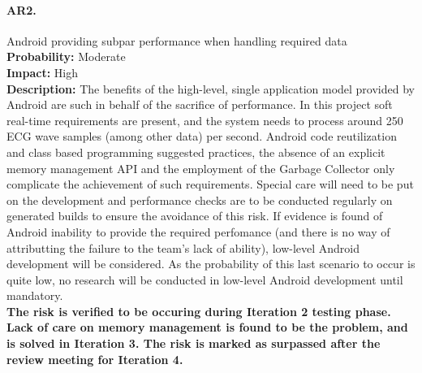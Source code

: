 		\paragraph{AR2.}Android providing subpar performance when handling required data\\
		\textbf{Probability:} Moderate\\
		\textbf{Impact:} High\\
		\textbf{Description:} The benefits of the high-level, single application model provided by Android are such in behalf of the sacrifice of performance. In this project soft real-time requirements are present, and the system needs to process around 250 ECG wave samples \cite{ecg.del.paper} (among other data) per second. Android code reutilization and class based programming suggested practices, the absence of an explicit memory management API and the employment of the Garbage Collector only complicate the achievement of such requirements.  
		Special care will need to be put on the development and performance checks are to be conducted regularly on generated builds to ensure the avoidance of this risk.
		If evidence is found of Android inability to provide the required perfomance (and there is no way of attributting the failure to the team's lack of ability), low-level Android development will be considered. As the probability of this last scenario to occur is quite low, no research will be conducted in low-level Android development until mandatory.\\
		\textbf{The risk is verified to be occuring during Iteration 2 testing phase. Lack of care on memory management is found to be the problem, and is solved in Iteration 3. The risk is marked as surpassed after the review meeting for Iteration 4.}

